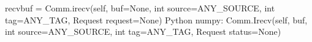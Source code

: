 recvbuf = Comm.irecv(self, buf=None, int source=ANY_SOURCE, int tag=ANY_TAG,
    Request request=None)
Python numpy:
Comm.Irecv(self, buf, int source=ANY_SOURCE, int tag=ANY_TAG,
    Request status=None)
